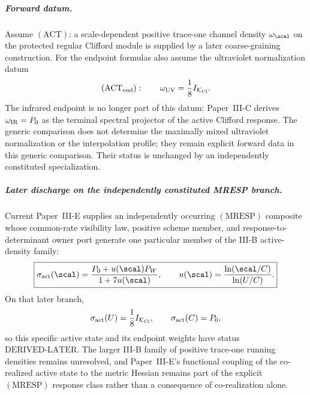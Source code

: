 \documentclass[11pt,a4paper]{article}
\begin{document}
\subparagraph{Forward datum.}
Assume \((\mathrm{ACT})\): a scale-dependent positive trace-one channel
density \(\omega_{\scal}\) on the protected regular Clifford module is
supplied by a later coarse-graining construction.  For the endpoint formulas
also assume the ultraviolet normalization datum
\[
 (\mathrm{ACT}_{\rm end}):
 \qquad
 \omega_{\rm UV}=\frac18 I_{\mathcal K_{\rm Cl}}.
\]
The infrared endpoint is no longer part of this datum: Paper~III-C derives
\(\omega_{\rm IR}=P_0\) as the terminal spectral projector of the active
Clifford response. The generic comparison does not determine the maximally mixed
ultraviolet normalization or the interpolation profile; they
remain explicit forward data in this generic comparison. Their status
is unchanged by an independently constituted specialization.

\subparagraph{Later discharge on the independently constituted MRESP branch.}
Current Paper~III-E supplies an independently occurring
\((\mathrm{MRESP})\) composite whose common-rate visibility law, positive
scheme member, and response-to-determinant owner port generate one particular
member of the III-B active-density family:
\[
 \boxed{
 \sigma_{\rm act}(\scal)
 =\frac{P_0+u(\scal)P_W}{1+7u(\scal)},
 \qquad
 u(\scal)=\frac{\ln(\scal/C)}{\ln(U/C)}.}
\]
On that later branch,
\[
 \sigma_{\rm act}(U)=\frac18 I_{\mathcal K_{\rm Cl}},
 \qquad
 \sigma_{\rm act}(C)=P_0,
\]
so this specific active state and its endpoint weights have status
\(\mathrm{DERIVED\text{-}LATER}\).  The larger III-B family of positive
trace-one running densities remains unresolved, and Paper~III-E's functional
coupling of the co-realized active state to the metric Hessian remains part of
the explicit \((\mathrm{MRESP})\) response class rather than a consequence of
co-realization alone.
\end{document}
